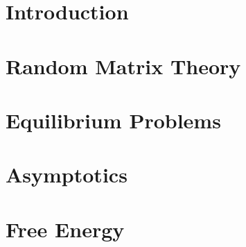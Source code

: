 \documentclass[mestrado, pre-defesa]{packages/icmc}
\begin{document}





\textual

\chapter{Introduction}
\label{chapter: Intro}
%

\chapter{Random Matrix Theory}
\label{chapter: RMT}
%

\chapter{Equilibrium Problems}
\label{chapter: equilibrium}
%

\chapter{Asymptotics}
\label{chapter:asymptotics}%


\chapter{Free Energy}
\label{chapter: planarensembles}
%

%
% 
\end{document}
